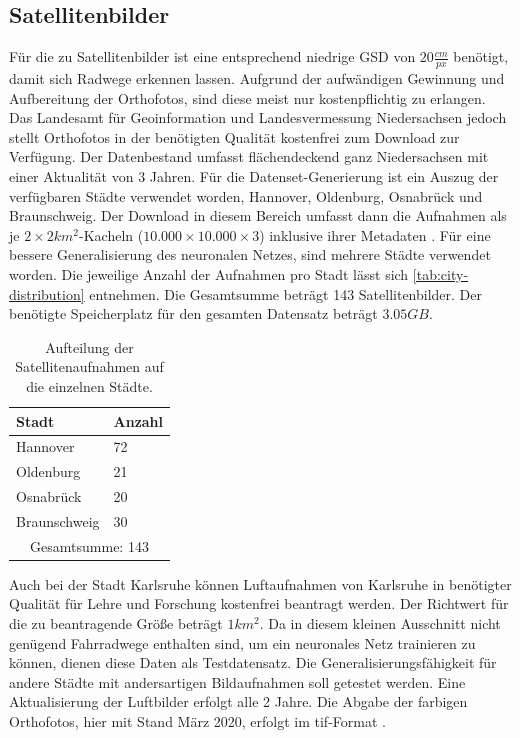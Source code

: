 \subsection{Satellitenbilder}

Für die zu Satellitenbilder ist eine entsprechend niedrige \ac{GSD} von $20 \frac{cm}{px}$ benötigt, damit sich Radwege erkennen lassen. 
Aufgrund der aufwändigen Gewinnung und Aufbereitung der Orthofotos, sind diese meist nur kostenpflichtig zu erlangen.
Das Landesamt für Geoinformation und Landesvermessung Niedersachsen jedoch stellt Orthofotos in der benötigten Qualität kostenfrei zum Download zur Verfügung.
Der Datenbestand umfasst flächendeckend ganz Niedersachsen mit einer Aktualität von 3 Jahren.
Für die Datenset-Generierung ist ein Auszug der verfügbaren Städte verwendet worden, Hannover, Oldenburg, Osnabrück und Braunschweig. 
Der Download in diesem Bereich umfasst dann die Aufnahmen als je $2\times2 km^2$-Kacheln ($10.000\times 10.000\times 3$) inklusive ihrer Metadaten \cite{.26.10.2022}.
Für eine bessere Generalisierung des neuronalen Netzes, sind mehrere Städte verwendet worden.
Die jeweilige Anzahl der Aufnahmen pro Stadt lässt sich \autoref{tab:city-distribution} entnehmen.
Die Gesamtsumme beträgt 143 Satellitenbilder.
Der benötigte Speicherplatz für den gesamten Datensatz beträgt $3.05 GB$.

\begin{table}
	\centering
	\begin{tabular}{l|l}
		Stadt & Anzahl\\
		\midrule
		Hannover &72 \\
		Oldenburg & 21 \\ 
		Osnabrück & 20 \\
		Braunschweig & 30 \\
		\midrule
		\multicolumn{2}{c}{Gesamtsumme: 143}\\
	\end{tabular}
	\caption{Aufteilung der Satellitenaufnahmen auf die einzelnen Städte.}
	\label{tab:city-distribution}
\end{table}

Auch bei der Stadt Karlsruhe können Luftaufnahmen von Karlsruhe in benötigter Qualität für Lehre und Forschung kostenfrei beantragt werden.
Der Richtwert für die zu beantragende Größe beträgt $1km^2$.
Da in diesem kleinen Ausschnitt nicht genügend Fahrradwege enthalten sind, um ein neuronales Netz trainieren zu können, dienen diese Daten als Testdatensatz.
Die Generalisierungsfähigkeit für andere Städte mit andersartigen Bildaufnahmen soll getestet werden.
Eine Aktualisierung der Luftbilder erfolgt alle 2 Jahre.
Die Abgabe der farbigen Orthofotos, hier mit Stand März 2020, erfolgt im tif-Format \cite{.04.12.2022}.

